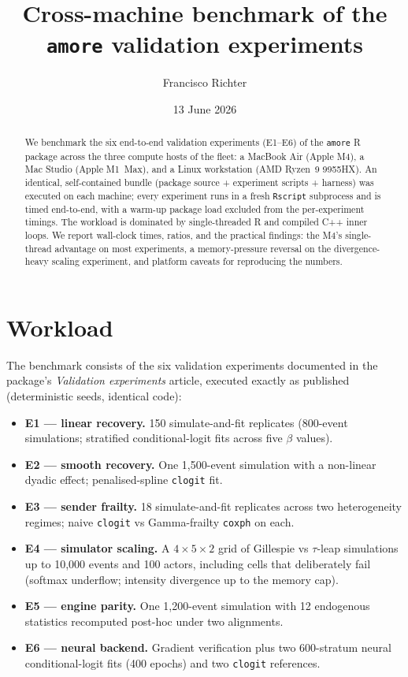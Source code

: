 \documentclass[11pt]{article}
\title{Cross-machine benchmark of the \texttt{amore} validation experiments}
\author{Francisco Richter}
\date{13 June 2026}
\begin{document}
\maketitle

\begin{abstract}
\noindent We benchmark the six end-to-end validation experiments (E1--E6) of the
\texttt{amore} R package across the three compute hosts of the fleet: a MacBook
Air (Apple M4), a Mac Studio (Apple M1~Max), and a Linux workstation (AMD
Ryzen~9 9955HX). An identical, self-contained bundle (package source +
experiment scripts + harness) was executed on each machine; every experiment
runs in a fresh \texttt{Rscript} subprocess and is timed end-to-end, with a
warm-up package load excluded from the per-experiment timings. The workload is
dominated by single-threaded R and compiled C++ inner loops. We report
wall-clock times, ratios, and the practical findings: the M4's
single-thread advantage on most experiments, a memory-pressure reversal on the
divergence-heavy scaling experiment, and platform caveats for reproducing the
numbers.
\end{abstract}

\section{Workload}

The benchmark consists of the six validation experiments documented in the
package's \emph{Validation experiments} article, executed exactly as published
(deterministic seeds, identical code):

\begin{itemize}\itemsep2pt
  \item \textbf{E1 — linear recovery.} 150 simulate-and-fit replicates
        (800-event simulations; stratified conditional-logit fits across five
        $\beta$ values).
  \item \textbf{E2 — smooth recovery.} One 1{,}500-event simulation with a
        non-linear dyadic effect; penalised-spline \texttt{clogit} fit.
  \item \textbf{E3 — sender frailty.} 18 simulate-and-fit replicates across
        two heterogeneity regimes; naive \texttt{clogit} vs Gamma-frailty
        \texttt{coxph} on each.
  \item \textbf{E4 — simulator scaling.} A $4\times5\times2$ grid of
        Gillespie vs $\tau$-leap simulations up to 10{,}000 events and 100
        actors, including cells that deliberately fail (softmax underflow;
        intensity divergence up to the memory cap).
  \item \textbf{E5 — engine parity.} One 1{,}200-event simulation with 12
        endogenous statistics recomputed post-hoc under two alignments.
  \item \textbf{E6 — neural backend.} Gradient verification plus two
        600-stratum neural conditional-logit fits (400 epochs) and two
        \texttt{clogit} references.
\end{itemize}
\end{document}
